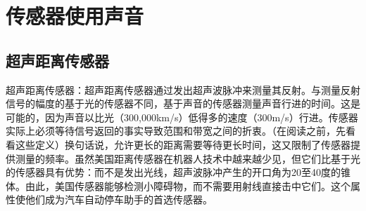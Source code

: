 
\section{传感器使用声音}
\subsection{超声距离传感器}
超声距离传感器：超声距离传感器通过发出超声波脉冲来测量其反射。与测量反射信号的幅度的基于光的传感器不同，基于声音的传感器测量声音行进的时间。这是可能的，因为声音以比光（300,000km/s）低得多的速度（300m/s）行进。传感器实际上必须等待信号返回的事实导致范围和带宽之间的折衷。（在阅读之前，先看看这些定义）换句话说，允许更长的距离需要等待更长时间，这又限制了传感器提供测量的频率。虽然美国距离传感器在机器人技术中越来越少见，但它们比基于光的传感器具有优势：而不是发出光线，超声波脉冲产生的开口角为20至40度的锥体。由此，美国传感器能够检测小障碍物，而不需要用射线直接击中它们。这个属性使他们成为汽车自动停车助手的首选传感器。



